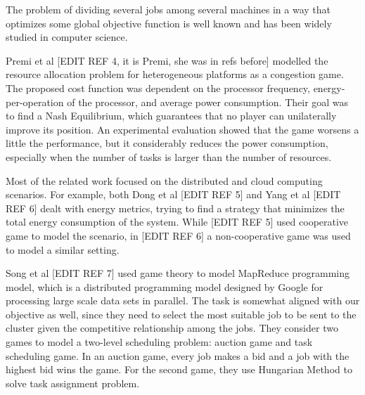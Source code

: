The problem of dividing several jobs among several machines in a way that optimizes some global objective function is well known and has been widely studied in computer science. 

Premi et al [EDIT REF 4, it is Premi, she was in refs before] modelled the resource allocation problem for heterogeneous platforms as a congestion game. The proposed cost function was dependent on the processor frequency, energy-per-operation of the processor, and average power consumption. Their goal was to find a Nash Equilibrium, which guarantees that no player can unilaterally improve its position. An experimental evaluation showed that the game worsens a little the performance, but it considerably reduces the power consumption, especially when the number of tasks is larger than the number of resources. 

Most of the related work focused on the distributed and cloud computing scenarios. For example, both Dong et al [EDIT REF 5] and Yang et al [EDIT REF 6] dealt with energy metrics, trying to find a strategy that minimizes the total energy consumption of the system. While [EDIT REF 5] used cooperative game to model the scenario, in [EDIT REF 6] a non-cooperative game was used to model a similar setting.

Song et al [EDIT REF 7] used game theory to model MapReduce programming model, which is a distributed programming model designed by Google for processing large scale data sets in parallel. The task is somewhat aligned with our objective as well, since they need to select the most suitable job to be sent to the cluster given the competitive relationship among the jobs. They consider two games to model a two-level scheduling problem: auction game and task scheduling game. In an auction game, every job makes a bid and a job with the highest bid wins the game. For the second game, they use Hungarian Method to solve task assignment problem.
